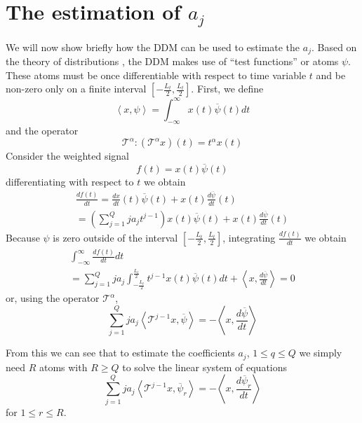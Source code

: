 \documentclass[twoside,a4paper]{article}
\begin{document}
\section{The estimation of $a_j$}
We will now show briefly how the DDM can be used to estimate the $a_j$. Based on
the theory of distributions \cite{schwartz1959theorie}, the DDM
makes use of ``test
functions'' or atoms $\psi$. These atoms must be once differentiable with
respect to time variable $t$ and be non-zero only on a finite interval
$[-\frac{L_{t}}{2},\frac{L_{t}}{2}]$. First, we define
%
\begin{equation}
    \label{eq:ddm:inner:prod:def}
    \left\langle x , \psi \right\rangle = 
    \int_{-\infty}^{\infty}x(t)\overline{\psi}(t)dt
\end{equation}
%
and the operator 
%
\[
\mathcal{T}^{\alpha} : (\mathcal{T}^{\alpha}x)(t) = t^{\alpha}x(t)
\]
%
Consider the weighted signal
%
\[
    f(t) = x(t) \overline{\psi}(t)
\]
%
differentiating with respect to $t$ we obtain
%
\begin{multline}
    \label{eq:ddm:weighted:sig:derivative}
    \frac{df(t)}{dt} = 
    \frac{dx}{dt}(t)\overline{\psi}(t)
    + x(t)\frac{d\overline{\psi}}{dt}(t) \\
    = \left( \sum_{j=1}^{Q} j a_j t^{j-1} \right) x(t)\overline{\psi}(t)
    + x(t)\frac{d\overline{\psi}}{dt}(t)
\end{multline}
%
Because $\psi$ is zero outside of the interval $[-\frac{L_{t}}{2},\frac{L_{t}}{2}]$, integrating
$\frac{df(t)}{dt}$ we obtain
%
\begin{multline*}
    \int_{-\infty}^{\infty}\frac{df(t)}{dt}dt \\
    = \sum_{j=1}^{Q} j a_j \int_{-\frac{L_{t}}{2}}^{\frac{L_{t}}{2}} t^{j-1} x(t) \overline{\psi}(t) dt
    + \left\langle x, \frac{d\overline{\psi}}{dt} \right\rangle = 0
\end{multline*}
%
or, using the operator $\mathcal{T}^{\alpha}$,
%
\[ 
    \sum_{j=1}^{Q} j a_j 
    \left\langle \mathcal{T}^{j-1} x , \overline{\psi} \right\rangle
    = -\left\langle x, \frac{d\overline{\psi}}{dt} \right\rangle
\]
%

From this we can see that to estimate the coefficients $a_j$, $ 1 \leq q \leq Q
$ we simply need $R$ atoms with $R \geq Q$ to solve the linear system of
equations
\begin{equation}
    \label{eq:ddmsyseq}
    \sum_{j=1}^{Q} j a_j 
    \left\langle \mathcal{T}^{j-1} x , \overline{\psi}_{r} \right\rangle
    = -\left\langle x, \frac{d\overline{\psi}_{r}}{dt} \right\rangle
\end{equation}
for $1 \leq r \leq R$.
\end{document}
